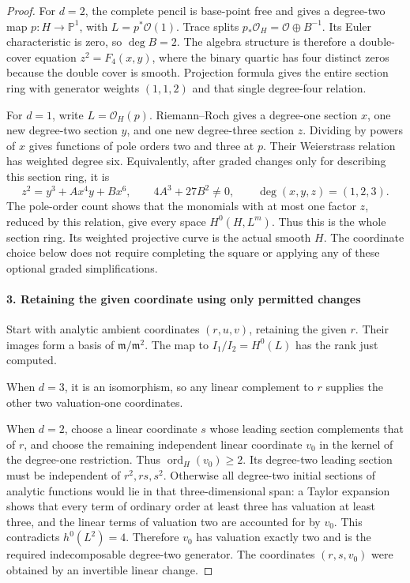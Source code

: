 \begin{proof}
For \(d=2\), the complete pencil is base-point free and gives
a degree-two map \(p:H\to\mathbb P^1\), with
\(L=p^*\mathcal O(1)\). Trace splits
\(p_*\mathcal O_H=\mathcal O\oplus B^{-1}\).
Its Euler characteristic is zero, so \(\deg B=2\).
The algebra structure is therefore a double-cover equation
\(z^2=F_4(x,y)\), where the binary quartic has four distinct
zeros because the double cover is smooth. Projection formula
gives the entire section ring with generator weights
\((1,1,2)\) and that single degree-four relation.

For \(d=1\), write \(L=\mathcal O_H(p)\).
Riemann--Roch gives a degree-one section \(x\), one new
degree-two section \(y\), and one new degree-three section
\(z\). Dividing by powers of \(x\) gives functions of pole
orders two and three at \(p\). Their Weierstrass relation
has weighted degree six. Equivalently, after graded changes
only for describing this section ring, it is
\[
 z^2=y^3+A x^4y+B x^6,
 \qquad 4A^3+27B^2\ne0,
 \qquad\deg(x,y,z)=(1,2,3).
\]
The pole-order count shows that the monomials with at most one
factor \(z\), reduced by this relation, give every space
\(H^0(H,L^m)\). Thus this is the whole section ring. Its
weighted projective curve is the actual smooth \(H\).
The coordinate choice below does not require completing the
square or applying any of these optional graded simplifications.

\paragraph{3. Retaining the given coordinate using only permitted changes}

Start with analytic ambient coordinates \((r,u,v)\), retaining
the given \(r\). Their images form a basis of
\(\mathfrak m/\mathfrak m^2\). The map to
\(I_1/I_2=H^0(L)\) has the rank just computed.

When \(d=3\), it is an isomorphism, so any linear complement
to \(r\) supplies the other two valuation-one coordinates.

When \(d=2\), choose a linear coordinate \(s\) whose
leading section complements that of \(r\), and choose the
remaining independent linear coordinate \(v_0\) in the
kernel of the degree-one restriction. Thus
\(\operatorname{ord}_H(v_0)\ge2\). Its degree-two leading
section must be independent of \(r^2,rs,s^2\). Otherwise
all degree-two initial sections of analytic functions would
lie in that three-dimensional span: a Taylor expansion shows
that every term of ordinary order at least three has valuation
at least three, and the linear terms of valuation two are
accounted for by \(v_0\). This contradicts
\(h^0(L^2)=4\). Therefore \(v_0\) has valuation exactly
two and is the required indecomposable degree-two generator.
The coordinates \((r,s,v_0)\) were obtained by an invertible
linear change.


\end{proof}
